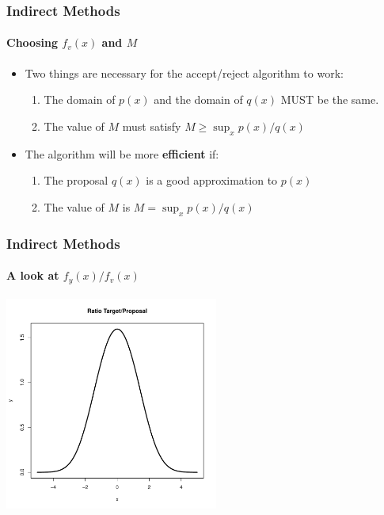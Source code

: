 \documentclass[10pt]{beamer}
\begin{document}
              \begin{frame}
                \frametitle{Indirect Methods}
                \framesubtitle{Choosing $f_v(x)$ and $M$}
                \begin{itemize}
                \item Two things are necessary for the accept/reject algorithm to work:
                  \begin{enumerate}
                  \item The domain of $p(x)$ and the domain of $q(x)$ MUST be the same.
                  \item The value of $M$ must satisfy $M\geq \sup_x p(x)/q(x)$
                  \end{enumerate}
                \item The algorithm will be more {\bf efficient} if:
                  \begin{enumerate}
                  \item The proposal $q(x)$ is a good approximation to $p(x)$
                  \item The value of $M$ is $M=\sup_x p(x)/q(x)$
                  \end{enumerate}
                \end{itemize}
              \end{frame}

              \begin{frame}
                \frametitle{Indirect Methods}
                \framesubtitle{A look at $f_y(x)/f_v(x)$}
                \begin{center}
                  \includegraphics[height=7cm]{./Pics/rat1.pdf}
                \end{center}
              \end{frame}
\end{document}
